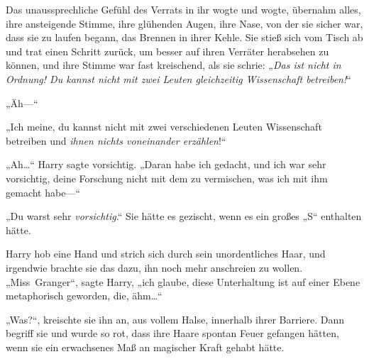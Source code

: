 Das unaussprechliche Gefühl des Verrats in ihr wogte und wogte, übernahm alles, ihre ansteigende Stimme, ihre glühenden Augen, ihre Nase, von der sie sicher war, dass sie zu laufen begann, das Brennen in ihrer Kehle. Sie stieß sich vom Tisch ab und trat einen Schritt zurück, um besser auf ihren Verräter herabsehen zu können, und ihre Stimme war fast kreischend, als sie schrie:
„\emph{Das ist nicht in Ordnung! Du kannst nicht mit zwei Leuten gleichzeitig Wissenschaft betreiben!}“

„Äh—“

„Ich meine, du kannst nicht mit zwei verschiedenen Leuten Wissenschaft betreiben und \emph{ihnen nichts voneinander erzählen}!“

„Ah…“ Harry sagte vorsichtig. „Daran habe ich gedacht, und ich war sehr vorsichtig, deine Forschung nicht mit dem zu vermischen, was ich mit ihm gemacht habe—“

„Du warst sehr \emph{vorsichtig}.“
Sie hätte es gezischt, wenn es ein großes „S“ enthalten hätte.

Harry hob eine Hand und strich sich durch sein unordentliches Haar, und irgendwie brachte sie das dazu, ihn noch mehr anschreien zu wollen.
„Miss~Granger“, sagte Harry, „ich glaube, diese Unterhaltung ist auf einer Ebene metaphorisch geworden, die, ähm…“

„Was?“, kreischte sie ihn an, aus vollem Halse, innerhalb ihrer Barriere. Dann begriff sie und wurde so rot, dass ihre Haare spontan Feuer gefangen hätten, wenn sie ein erwachsenes Maß an magischer Kraft gehabt hätte.

